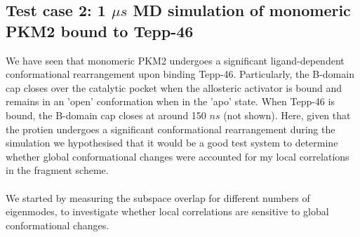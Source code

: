 \documentclass[11pt]{article}
\begin{document}
\subsection*{Test case 2: 1 $\mu s$ MD simulation of monomeric PKM2 bound to Tepp-46}
We have seen that monomeric PKM2 undergoes a significant ligand-dependent conformational rearrangement upon binding Tepp-46. Particularly, the B-domain cap closes over the catalytic pocket when the allosteric activator is bound and remains in an 'open' conformation when in the 'apo' state. When Tepp-46 is bound, the B-domain cap closes at around 150 $ns$ (not shown). Here, given that the protien undergoes a significant conformational rearrangement during the simulation we hypothesised that it would be a good test system to determine whether global conformational changes were accounted for my local correlations in the fragment scheme.
\\
\\
We started by measuring the subspace overlap for different numbers of eigenmodes, to investigate whether local correlations are sensitive to global conformational changes. 
\end{document}
